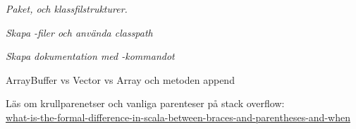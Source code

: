 \Task \emph{Paket,  och klassfilstrukturer.}

\Task \emph{Skapa -filer och använda classpath}

\Task \emph{Skapa dokumentation med -kommandot}


\ExtraTasks %

\Task 

\AdvancedTasks %

\Task ArrayBuffer vs Vector vs Array och metoden append

\Task Läs om krullparenetser och vanliga parenteser på stack overflow: \\ \href{http://stackoverflow.com/questions/4386127/what-is-the-formal-difference-in-scala-between-braces-and-parentheses-and-when}{what-is-the-formal-difference-in-scala-between-braces-and-parentheses-and-when}